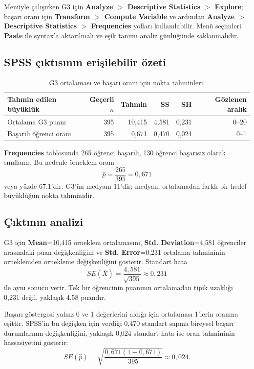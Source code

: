 Menüyle çalışırken G3 için \textbf{Analyze $>$ Descriptive Statistics $>$
Explore}; başarı oranı için \textbf{Transform $>$ Compute Variable} ve
ardından \textbf{Analyze $>$ Descriptive Statistics $>$ Frequencies} yolları
kullanılabilir. Menü seçimleri \textbf{Paste} ile syntax'a aktarılmalı ve
eşik tanımı analiz günlüğünde saklanmalıdır.

\subsection{SPSS çıktısının erişilebilir özeti}

\begin{table}[htbp]
\centering
\caption{G3 ortalaması ve başarı oranı için nokta tahminleri.}
\begin{tabular}{@{}p{}rrrrr@{}}
\toprule
Tahmin edilen büyüklük & Geçerli $n$ & Tahmin & SS & SH & Gözlenen aralık \\
\midrule
Ortalama G3 puanı & 395 & 10,415 & 4,581 & 0,231 & 0--20 \\
Başarılı öğrenci oranı & 395 & 0,671 & 0,470 & 0,024 & 0--1 \\
\bottomrule
\end{tabular}
\end{table}

\textbf{Frequencies} tablosunda 265 öğrenci başarılı, 130 öğrenci başarısız
olarak sınıflanır. Bu nedenle örneklem oranı
\[
\hat p=\frac{265}{395}=0{,}671
\]
veya yüzde 67,1'dir. G3'ün medyanı 11'dir; medyan, ortalamadan farklı bir
hedef büyüklüğün nokta tahminidir.

\subsection{Çıktının analizi}

G3 için \textbf{Mean}=10,415 örneklem ortalamasını, \textbf{Std.
Deviation}=4,581 öğrenciler arasındaki puan değişkenliğini ve \textbf{Std.
Error}=0,231 ortalama tahmininin örneklemden örnekleme değişkenliğini gösterir.
Standart hata
\[
SE(\bar X)=\frac{4{,}581}{\sqrt{395}}\approx0{,}231
\]
ile aynı sonucu verir. Tek bir öğrencinin puanının ortalamadan tipik uzaklığı
0,231 değil, yaklaşık 4,58 puandır.

Başarı göstergesi yalnız 0 ve 1 değerlerini aldığı için ortalaması 1'lerin
oranına eşittir. SPSS'in bu değişken için verdiği 0,470 standart sapma bireysel
başarı durumlarının değişkenliğini, yaklaşık 0,024 standart hata ise oran
tahmininin hassasiyetini gösterir:
\[
SE(\hat p)=\sqrt{\frac{0{,}671(1-0{,}671)}{395}}
\approx0{,}024.
\]

